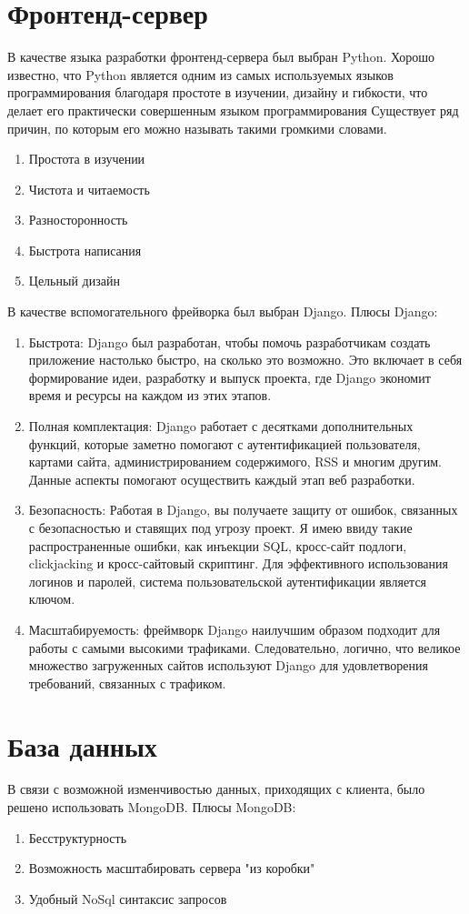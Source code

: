 \section{Фронтенд-сервер}
В качестве языка разработки фронтенд-сервера был выбран Python.
Хорошо известно, что Python является одним из самых используемых языков программирования благодаря простоте в изучении, дизайну и гибкости, что делает его практически совершенным языком программирования\cite{book4} Существует ряд причин, по которым его можно называть такими громкими словами.
	 \begin{enumerate}
	\item Простота в изучении
	\item Чистота и читаемость
	\item Разносторонность
	\item Быстрота написания
	\item  Цельный дизайн
	 \end{enumerate}
	 В качестве вспомогательного фрейворка был выбран Django. Плюсы Django:
	 	 \begin{enumerate}
	\item Быстрота: Django был разработан, чтобы помочь разработчикам создать приложение настолько быстро, на сколько это возможно. Это включает в себя формирование идеи, разработку и выпуск проекта, где Django экономит время и ресурсы на каждом из этих этапов. 
	 	\item Полная комплектация: Django работает с десятками дополнительных функций, которые заметно помогают с аутентификацией пользователя, картами сайта, администрированием содержимого, RSS и многим другим. Данные аспекты помогают осуществить каждый этап веб разработки.
		\item  Безопасность: Работая в Django, вы получаете защиту от ошибок, связанных с безопасностью и ставящих под угрозу проект. Я имею ввиду такие распространенные ошибки, как инъекции SQL, кросс-сайт подлоги, clickjacking и кросс-сайтовый скриптинг. Для эффективного использования логинов и паролей, система пользовательской аутентификации является ключом.
	 	\item  Масштабируемость: фреймворк Django наилучшим образом подходит для работы с самыми высокими трафиками. Следовательно, логично, что великое множество загруженных сайтов используют Django для удовлетворения требований, связанных с трафиком.

	 	 \end{enumerate}
\section{База данных}
В связи с возможной изменчивостью данных, приходящих с клиента, было решено использовать MongoDB.
Плюсы MongoDB:
	 \begin{enumerate}
	 	\item Бесструктурность
	 	\item Возможность масштабировать сервера "из коробки"
	 	\item Удобный NoSql синтаксис запросов
	 	\end {enumerate}


